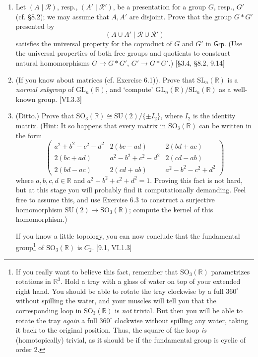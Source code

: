 \begin{enumerate}
      \item Let $(A \mid \mathscr{R})$, resp., $(A' \mid \mathscr{R}')$, be a presentation for a group $G$, resp., $G'$ (cf. \S8.2); we may assume that $A, A'$ are disjoint. Prove that the group $G \ast G'$ presented by
            \[ (A \cup A' \mid \mathscr{R} \cup \mathscr{R}') \]
            satisfies the universal property for the coproduct of $G$ and $G'$ in $\mathsf{Grp}$. (Use the universal properties of both free groups and quotients to construct natural homomorphisms $G \to G \ast G'$, $G' \to G \ast G'$.) [\S3.4, \S8.2, 9.14]

      \item (If you know about matrices (cf. Exercise 6.1)). Prove that $\text{SL}_n(\mathbb{R})$ is a \emph{normal subgroup} of $\text{GL}_n(\mathbb{R})$, and `compute' $\text{GL}_n(\mathbb{R})/\text{SL}_n(\mathbb{R})$ as a well-known group. [VI.3.3]

      \item (Ditto.) Prove that $\text{SO}_3(\mathbb{R}) \cong \text{SU}(2)/\{\pm I_2\}$, where $I_2$ is the identity matrix. (Hint: It so happens that every matrix in $\text{SO}_3(\mathbb{R})$ can be written in the form
            \[
                  \begin{pmatrix}
                        a^2+b^2-c^2-d^2 & 2(bc-ad)        & 2(bd+ac)        \\
                        2(bc+ad)        & a^2-b^2+c^2-d^2 & 2(cd-ab)        \\
                        2(bd-ac)        & 2(cd+ab)        & a^2-b^2-c^2+d^2
                  \end{pmatrix}
            \]
            where $a, b, c, d \in \mathbb{R}$ and $a^2+b^2+c^2+d^2=1$. Proving this fact is not hard, but at this stage you will probably find it computationally demanding. Feel free to assume this, and use Exercise 6.3 to construct a surjective homomorphism $\text{SU}(2) \to \text{SO}_3(\mathbb{R})$; compute the kernel of this homomorphism.)

            If you know a little topology, you can now conclude that the fundamental group\footnote{If you really want to believe this fact, remember that $\mathrm{SO}_3(\mathbb{R})$ parametrizes rotations in $\mathbb{R}^3$. Hold a tray with a glass of water on top of your extended right hand. You should be able to rotate the tray clockwise by a full $360^\circ$ without spilling the water, and your muscles will tell you that the corresponding loop in $\mathrm{SO}_3(\mathbb{R})$ is \emph{not} trivial. But then you will be able to rotate the tray \emph{again} a full $360^\circ$ clockwise without spilling any water, taking it back to the original position. Thus, the square of the loop \emph{is} (homotopically) trivial, as it should be if the fundamental group is cyclic of order 2.}
            of $\text{SO}_3(\mathbb{R})$ is $C_2$. [9.1, VI.1.3]


\end{enumerate}
